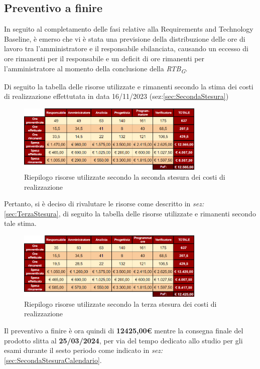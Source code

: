 \subsection{Preventivo a finire}
In seguito al completamento delle fasi relative alla Requirements and Technology Baseline, è emerso che vi è stata una previsione della distribuzione delle ore di lavoro tra l'amministratore e il responsabile sbilanciata, causando un eccesso di ore rimanenti per il responsabile e un deficit di ore rimanenti per l'amministratore al momento della conclusione della \textit{RTB}\textsubscript{\textit{G}}.

Di seguito la tabella delle risorse utilizzate e rimanenti secondo la stima dei costi di realizzazione effettutata in data 16/11/2023 (sez:\ref{sec:SecondaStesura})
\begin{figure}[H]
    \centering
    \includegraphics[width=0.8\textwidth]{../Images/PaF1stesura.PNG}
    \caption{Riepilogo risorse utilizzate secondo la seconda stesura dei costi di realizzazione}
    \label{fig:RisorseRimanentiRTB}
\end{figure}

Pertanto, si è deciso di rivalutare le risorse come descritto in \textit{sez:} \ref{sec:TerzaStesura},
di seguito la tabella delle risorse utilizzate e rimanenti secondo tale stima.

\begin{figure}[H]
    \centering
    \includegraphics[width=0.8\textwidth]{../Images/PaF2stesura.PNG}
    \caption{Riepilogo risorse utilizzate secondo la terza stesura dei costi di realizzazione}
    \label{fig:RisorseRimanentiRTB2}
\end{figure}    
Il preventivo a finire è ora quindi di \textbf{12425,00€} mentre la consegna finale del prodotto slitta al \textbf{25/03/2024}, per via del tempo dedicato allo studio per gli esami durante il sesto periodo come indicato in \textit{sez:} \ref{sec:SecondaStesuraCalendario}.

